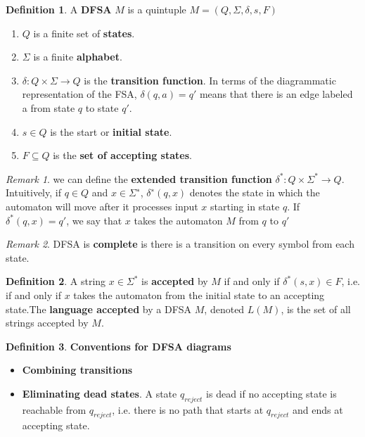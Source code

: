 \documentclass[11pt]{article}
\theoremstyle{plain}%
\theoremstyle{definition}
\newtheorem{defn}{Definition}
\theoremstyle{remark}
\newtheorem*{rem}{Remark}
\begin{document}
\begin{defn}
  \label{DFSA}
  A \textbf{DFSA} $M$ is a quintuple $M=(Q, \Sigma, \delta, s, F)$
  \begin{enumerate}
    \item  $Q$ is a finite set of \textbf{states}.
    \item $\Sigma$ is a finite \textbf{alphabet}.
    \item $\delta: Q\times \Sigma \rightarrow Q$ is the \textbf{transition function}. In terms of the diagrammatic representation of the FSA, $\delta(q, a) = q'$ means that there is an edge labeled a from state $q$ to state $q'$.
    \item $s \in Q$ is the start or \textbf{initial state}.
    \item $F \subseteq Q$ is the \textbf{set of accepting states}.
  \end{enumerate}
  \begin{rem}
    we can define the \textbf{extended transition function} $\delta^* :Q\times \Sigma^* \rightarrow Q$. Intuitively, if $q \in Q$ and $x \in \Sigma^∗$, $\delta^∗(q,x)$ denotes the state in which the automaton will move after it processes input $x$ starting in state $q$. If $\delta^* (q, x) = q'$, we say that $x$ takes the automaton $M$ from $q$ to $q'$
  \end{rem}
  \begin{rem}
    DFSA is \textbf{complete} is there is a transition on every symbol from each state.
  \end{rem}
\end{defn}

\begin{defn}
    A string $x\in\Sigma^*$ is \textbf{accepted} by $M$ if and only if $\delta^*(s,x)\in F$, i.e. if and only if $x$ takes the automaton from the initial state to an accepting state.The \textbf{language accepted} by a DFSA $M$, denoted $L(M)$, is the set of all strings accepted by $M$.
\end{defn}


\begin{defn}
  \textbf{Conventions for DFSA diagrams}
  \begin{itemize}
    \item \textbf{Combining transitions}
    \item \textbf{Eliminating dead states}. A state $q_{reject}$ is dead if no accepting state is reachable from $q_{reject}$, i.e. there is no path that starts at $q_{reject}$ and ends at accepting state.
  \end{itemize}

\end{defn}
\end{document}
